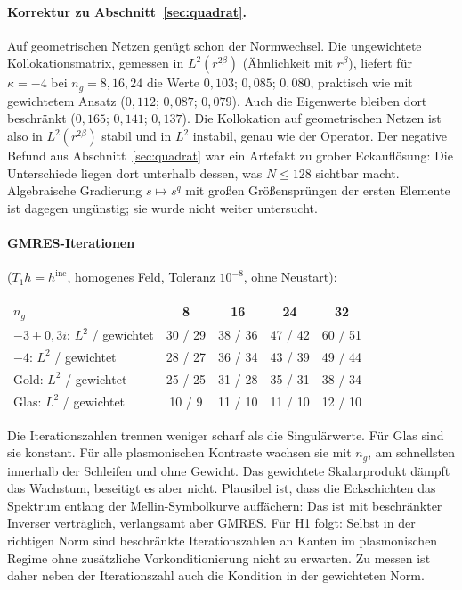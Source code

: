 \documentclass[11pt, a4paper]{article}
\theoremstyle{plain}
\theoremstyle{definition}
\begin{document}
\paragraph{Korrektur zu Abschnitt~\ref{sec:quadrat}.} Auf geometrischen Netzen
genügt schon der Normwechsel. Die ungewichtete Kollokationsmatrix, gemessen in
$L^2(r^{2\beta})$ (Ähnlichkeit mit $r^\beta$), liefert für $\kappa=-4$ bei
$n_g=8,16,24$ die Werte $0{,}103$; $0{,}085$; $0{,}080$, praktisch wie mit
gewichtetem Ansatz ($0{,}112$; $0{,}087$; $0{,}079$). Auch die Eigenwerte bleiben dort
beschränkt ($0{,}165$; $0{,}141$; $0{,}137$). Die Kollokation auf geometrischen Netzen
ist also in $L^2(r^{2\beta})$ stabil und in $L^2$ instabil, genau wie der Operator.
Der negative Befund aus Abschnitt~\ref{sec:quadrat} war ein Artefakt zu grober
Eckauflösung: Die Unterschiede liegen dort unterhalb dessen, was $N\le128$ sichtbar
macht. Algebraische Gradierung $s\mapsto s^q$ mit großen Größensprüngen der ersten
Elemente ist dagegen ungünstig; sie wurde nicht weiter untersucht.

\paragraph{GMRES-Iterationen} ($T_1h=h^{\mathrm{inc}}$, homogenes Feld, Toleranz
$10^{-8}$, ohne Neustart):
\begin{center}\small
\begin{tabular}{lcccc}
\toprule
$n_g$ & 8 & 16 & 24 & 32\\
\midrule
$-3+0{,}3i$: $L^2$ / gewichtet & 30 / 29 & 38 / 36 & 47 / 42 & 60 / 51\\
$-4$: $L^2$ / gewichtet & 28 / 27 & 36 / 34 & 43 / 39 & 49 / 44\\
Gold: $L^2$ / gewichtet & 25 / 25 & 31 / 28 & 35 / 31 & 38 / 34\\
Glas: $L^2$ / gewichtet & 10 / 9 & 11 / 10 & 11 / 10 & 12 / 10\\
\bottomrule
\end{tabular}
\end{center}
Die Iterationszahlen trennen weniger scharf als die Singulärwerte. Für Glas sind sie
konstant. Für alle plasmonischen Kontraste wachsen sie mit $n_g$, am schnellsten
innerhalb der Schleifen und ohne Gewicht. Das gewichtete Skalarprodukt dämpft das
Wachstum, beseitigt es aber nicht. Plausibel ist, dass die Eckschichten das Spektrum
entlang der Mellin-Symbolkurve auffächern: Das ist mit beschränkter Inverser
verträglich, verlangsamt aber GMRES. Für H1 folgt: Selbst in der richtigen Norm sind
beschränkte Iterationszahlen an Kanten im plasmonischen Regime ohne zusätzliche
Vorkonditionierung nicht zu erwarten. Zu messen ist daher neben der Iterationszahl
auch die Kondition in der gewichteten Norm.
\end{document}
